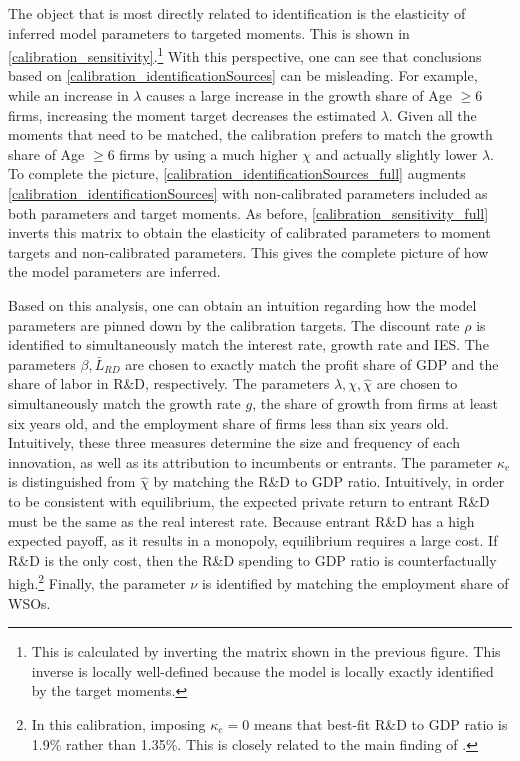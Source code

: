 \documentclass[ecta,nameyear,final]{econsocart}
\theoremstyle{plain}
\theoremstyle{remark}
\begin{document}
The object that is most directly related to identification is the elasticity of inferred model parameters to targeted moments. This is shown in \autoref{calibration_sensitivity}.\footnote{This is calculated by inverting the matrix shown in the previous figure. This inverse is locally well-defined because the model is locally exactly identified by the target moments.} With this perspective, one can see that conclusions based on \autoref{calibration_identificationSources} can be misleading. For example, while an increase in $\lambda$ causes a large increase in the growth share of Age $\ge 6$ firms, increasing the moment target decreases the estimated $\lambda$. Given all the moments that need to be matched, the calibration prefers to match the growth share of Age $\ge 6$ firms by using a much higher $\chi$ and actually slightly lower $\lambda$. To complete the picture, \autoref{calibration_identificationSources_full} augments \autoref{calibration_identificationSources} with non-calibrated parameters included as both parameters and target moments. As before, \autoref{calibration_sensitivity_full} inverts this matrix to obtain the elasticity of calibrated parameters to moment targets and non-calibrated parameters. This gives the complete picture of how the model parameters are inferred. 

Based on this analysis, one can obtain an intuition regarding how the model parameters are pinned down by the calibration targets. The discount rate $\rho$ is identified to simultaneously match the interest rate, growth rate and IES. The parameters $\beta, \bar{L}_{RD}$ are chosen to exactly match the profit share of GDP and the share of labor in R\&D, respectively. The parameters $\lambda, \chi, \hat{\chi}$ are chosen to simultaneously match the growth rate $g$, the share of growth from firms at least six years old, and the employment share of firms less than six years old. Intuitively, these three measures determine the size and frequency of each innovation, as well as its attribution to incumbents or entrants. The parameter $\kappa_e$ is distinguished from $\hat{\chi}$ by matching the R\&D to GDP ratio. Intuitively, in order to be consistent with equilibrium, the expected private return to entrant R\&D must be the same as the real interest rate. Because entrant R\&D has a high expected payoff, as it results in a monopoly, equilibrium requires a large cost. If R\&D is the only cost, then the R\&D spending to GDP ratio is counterfactually high.\footnote{In this calibration, imposing $\kappa_e = 0$ means that best-fit R\&D to GDP ratio is 1.9\% rather than 1.35\%. This is closely related to the main finding of \cite{comin_rd_2004}.} Finally, the parameter $\nu$ is identified by matching the employment share of WSOs. 
\end{document}
